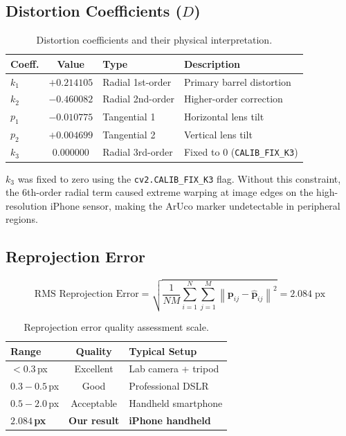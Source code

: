 \documentclass[12pt, a4paper, twoside]{report}
\begin{document}
\subsection{Distortion Coefficients ($D$)}
\begin{table}[H]
\centering
\caption{Distortion coefficients and their physical interpretation.}
\label{tab:distortion}
\begin{tabular}{lcll}
\toprule
\textbf{Coeff.} & \textbf{Value} & \textbf{Type} & \textbf{Description} \\
\midrule
$k_1$ & $+0.214105$ & Radial 1st-order & Primary barrel distortion \\
$k_2$ & $-0.460082$ & Radial 2nd-order & Higher-order correction \\
$p_1$ & $-0.010775$ & Tangential 1 & Horizontal lens tilt \\
$p_2$ & $+0.004699$ & Tangential 2 & Vertical lens tilt \\
$k_3$ & $0.000000$ & Radial 3rd-order & Fixed to 0 (\texttt{CALIB\_FIX\_K3}) \\
\bottomrule
\end{tabular}
\end{table}

\begin{importantbox}
$k_3$ was fixed to zero using the \texttt{cv2.CALIB\_FIX\_K3} flag. Without this constraint, the 6th-order radial term caused extreme warping at image edges on the high-resolution iPhone sensor, making the ArUco marker undetectable in peripheral regions.
\end{importantbox}

\subsection{Reprojection Error}
\begin{equation}
\text{RMS Reprojection Error} = \sqrt{\frac{1}{NM}\sum_{i=1}^{N}\sum_{j=1}^{M}\left\|\mathbf{p}_{ij} - \hat{\mathbf{p}}_{ij}\right\|^2} = 2.084\;\text{px}
\end{equation}

\begin{table}[H]
\centering
\caption{Reprojection error quality assessment scale.}
\begin{tabular}{lcl}
\toprule
\textbf{Range} & \textbf{Quality} & \textbf{Typical Setup} \\
\midrule
$< 0.3$\,px & Excellent & Lab camera + tripod \\
$0.3 - 0.5$\,px & Good & Professional DSLR \\
$0.5 - 2.0$\,px & Acceptable & Handheld smartphone \\
\rowcolor{blue!5}
$\mathbf{2.084}$\,\textbf{px} & \textbf{Our result} & \textbf{iPhone handheld} \\
\bottomrule
\end{tabular}
\end{table}
\end{document}
